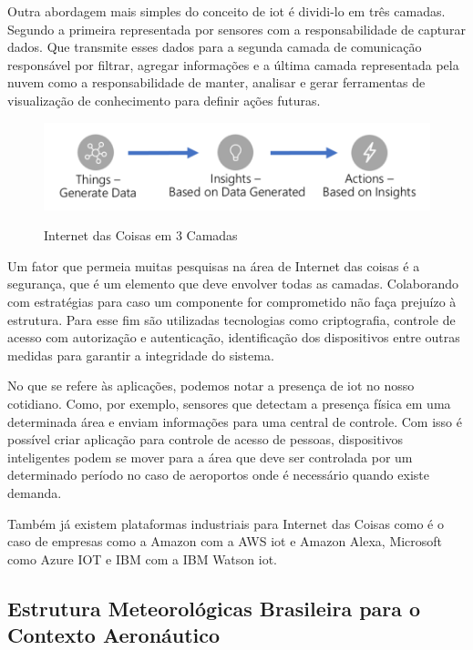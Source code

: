 Outra abordagem mais simples do conceito de iot é dividi-lo em três camadas. Segundo \cite{zmud2018primer} a primeira representada por sensores com a responsabilidade de capturar dados. Que transmite esses dados para a segunda camada de comunicação responsável por filtrar, agregar informações e a última camada representada pela nuvem como a responsabilidade de manter, analisar e gerar ferramentas de visualização de conhecimento para definir ações futuras.

\begin{figure} [!h]
    \centering
    \caption{Internet das Coisas em 3 Camadas}
    \includegraphics [scale = 0.40] {Figuras/framework_IOT.png}
    \label{fig:4}
\end{figure}

Um fator que permeia muitas pesquisas na área de Internet das coisas é a segurança, que é um elemento que deve envolver todas as camadas. Colaborando com estratégias para caso um componente for comprometido não faça prejuízo à estrutura. Para esse fim são utilizadas tecnologias como criptografia, controle de acesso com autorização e autenticação, identificação dos dispositivos entre outras medidas para garantir a integridade do sistema.

No que se refere às aplicações, podemos notar a presença de iot no nosso cotidiano. Como, por exemplo, sensores que detectam a presença física em uma determinada área e enviam informações para uma central de controle. Com isso é possível criar aplicação para controle de acesso de pessoas, dispositivos inteligentes podem se mover para a área que deve ser controlada por um determinado período no caso de aeroportos onde é necessário quando existe demanda\cite{hui2008rfid}.

Também já existem plataformas industriais para Internet das Coisas como é o caso de empresas como a Amazon com a AWS iot e Amazon Alexa, Microsoft como Azure IOT e IBM com a IBM Watson iot.


\subsection {Estrutura Meteorológicas Brasileira para o Contexto Aeronáutico}

